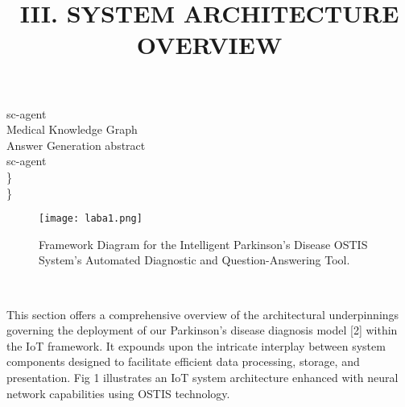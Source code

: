 \documentclass[a4paper,10pt,twocolumn]{article}
\begin{document}
sc-agent\\
\bullet Medical Knowledge Graph\\
\bullet Answer Generation abstract\\
sc-agent\\
\}\\
\}
\newpage
\begin{figure}
    \centering
    \vspace{0cm}
    \texttt{[image: laba1.png]}
    \caption{Framework Diagram for the Intelligent Parkinson’s Disease
OSTIS System’s Automated Diagnostic and Question-Answering Tool.}
\end{figure}
\hfill \break
 \title{III. SYSTEM ARCHITECTURE OVERVIEW}\\
\begin{flushleft}
This section offers a comprehensive overview of the
architectural underpinnings governing the deployment of
our Parkinson’s disease diagnosis model [2] within the
IoT framework. It expounds upon the intricate interplay
between system components designed to facilitate efficient data processing, storage, and presentation. Fig
1 illustrates an IoT system architecture enhanced with
neural network capabilities using OSTIS technology.


\end{flushleft}
\end{document}
